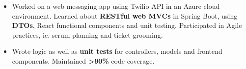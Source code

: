 \documentclass[9pt]{developercv} %
\begin{document}
\begin{minipage}[t]{\textwidth}
\begin{itemize}[noitemsep,topsep=0pt]
		\item Worked on a web messaging app using Twilio API in an Azure cloud environment.
		Learned about \textbf{RESTful web MVCs} in Spring Boot, using \textbf{DTOs},
		React functional components and unit testing. Participated in Agile practices, ie. scrum planning and ticket grooming. 
		\item Wrote logic as well as \textbf{unit tests} for controllers, models and frontend components. Maintained \textbf{>90\%} code coverage.
	\end{itemize}
\end{minipage}

\end{document}
